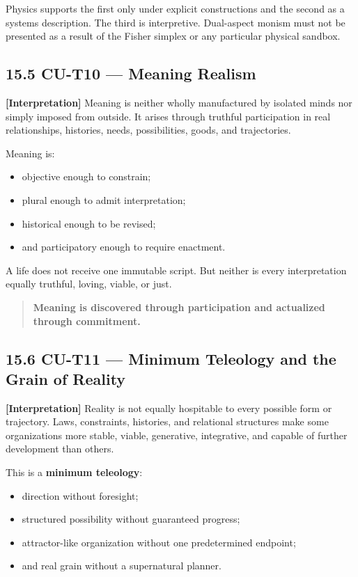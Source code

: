 \documentclass[
  11pt,
]{article}
\providecommand{\tightlist}{%
  \setlength{\itemsep}{0pt}\setlength{\parskip}{0pt}}
\begin{document}
Physics supports the first only under explicit constructions and the
second as a systems description. The third is interpretive. Dual-aspect
monism must not be presented as a result of the Fisher simplex or any
particular physical sandbox.

\subsection{15.5 CU-T10 --- Meaning
Realism}\label{cu-t10-meaning-realism}

\textbf{{[}Interpretation{]}} Meaning is neither wholly manufactured by
isolated minds nor simply imposed from outside. It arises through
truthful participation in real relationships, histories, needs,
possibilities, goods, and trajectories.

Meaning is:

\begin{itemize}
\tightlist
\item
  objective enough to constrain;
\item
  plural enough to admit interpretation;
\item
  historical enough to be revised;
\item
  and participatory enough to require enactment.
\end{itemize}

A life does not receive one immutable script. But neither is every
interpretation equally truthful, loving, viable, or just.

\begin{quote}
\textbf{Meaning is discovered through participation and actualized
through commitment.}
\end{quote}

\subsection{15.6 CU-T11 --- Minimum Teleology and the Grain of
Reality}\label{cu-t11-minimum-teleology-and-the-grain-of-reality}

\textbf{{[}Interpretation{]}} Reality is not equally hospitable to every
possible form or trajectory. Laws, constraints, histories, and
relational structures make some organizations more stable, viable,
generative, integrative, and capable of further development than others.

This is a \textbf{minimum teleology}:

\begin{itemize}
\tightlist
\item
  direction without foresight;
\item
  structured possibility without guaranteed progress;
\item
  attractor-like organization without one predetermined endpoint;
\item
  and real grain without a supernatural planner.
\end{itemize}
\end{document}
